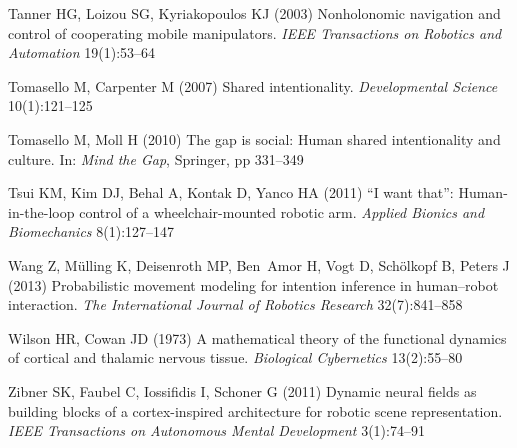 \documentclass[natbib, twocolumn]{svjour3}          %
\begin{document}
\begin{thebibliography}{54}
	Tanner HG, Loizou SG, Kyriakopoulos KJ (2003) Nonholonomic navigation and
	control of cooperating mobile manipulators. \textit{IEEE Transactions on
		Robotics and Automation} 19(1):53--64
	
	Tomasello M, Carpenter M (2007) Shared intentionality. \textit{Developmental
		Science} 10(1):121--125
	
	Tomasello M, Moll H (2010) The gap is social: Human shared intentionality and
	culture. In: \textit{Mind the Gap}, Springer, pp 331--349
	
	Tsui KM, Kim DJ, Behal A, Kontak D, Yanco HA (2011) “{I} want that”:
	Human-in-the-loop control of a wheelchair-mounted robotic arm.
	\textit{Applied Bionics and Biomechanics} 8(1):127--147
	
	Wang Z, M{\"u}lling K, Deisenroth MP, Ben~Amor H, Vogt D, Sch{\"o}lkopf B,
	Peters J (2013) Probabilistic movement modeling for intention inference in
	human--robot interaction. \textit{The International Journal of Robotics
		Research} 32(7):841--858
	
	Wilson HR, Cowan JD (1973) A mathematical theory of the functional dynamics of
	cortical and thalamic nervous tissue. \textit{Biological Cybernetics}
	13(2):55--80
	
	Zibner SK, Faubel C, Iossifidis I, Schoner G (2011) Dynamic neural fields as
	building blocks of a cortex-inspired architecture for robotic scene
	representation. \textit{IEEE Transactions on Autonomous Mental Development}
	3(1):74--91
	
\end{thebibliography}
\end{document}

